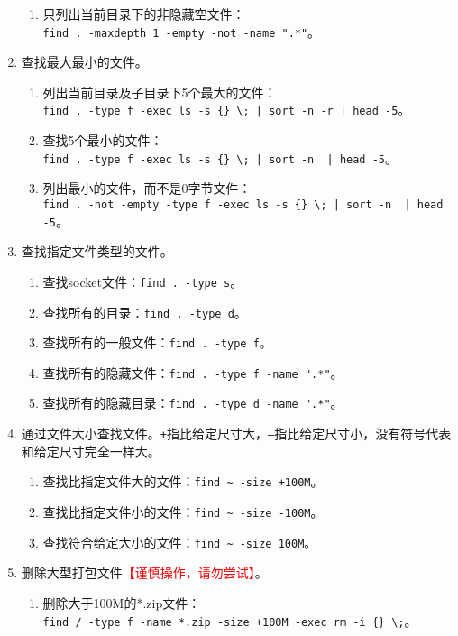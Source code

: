 \begin{enumerate}
\begin{enumerate}
      \item 只列出当前目录下的非隐藏空文件：\\ \verb|find . -maxdepth 1 -empty -not -name ".*"|。
    \end{enumerate}
  \item 查找最大最小的文件。
    \begin{enumerate}
      \item 列出当前目录及子目录下5个最大的文件：\\ \verb=find . -type f -exec ls -s {} \; | sort -n -r | head -5=。
      \item 查找5个最小的文件：\\ \verb=find . -type f -exec ls -s {} \; | sort -n  | head -5=。
      \item 列出最小的文件，而不是0字节文件：\\ \verb=find . -not -empty -type f -exec ls -s {} \; | sort -n  | head -5=。
    \end{enumerate}
  \item 查找指定文件类型的文件。
    \begin{enumerate}
      \item 查找socket文件：\verb|find . -type s|。
      \item 查找所有的目录：\verb|find . -type d|。
      \item 查找所有的一般文件：\verb|find . -type f|。
      \item 查找所有的隐藏文件：\verb|find . -type f -name ".*"|。
      \item 查找所有的隐藏目录：\verb|find . -type d -name ".*"|。
    \end{enumerate}
  \item 通过文件大小查找文件。\verb|+|指比给定尺寸大，\verb|–|指比给定尺寸小，没有符号代表和给定尺寸完全一样大。 
    \begin{enumerate}
      \item 查找比指定文件大的文件：\verb|find ~ -size +100M|。
      \item 查找比指定文件小的文件：\verb|find ~ -size -100M|。
      \item 查找符合给定大小的文件：\verb|find ~ -size 100M|。
    \end{enumerate}
  \item 删除大型打包文件\textcolor{red}{【谨慎操作，请勿尝试】}。
    \begin{enumerate}
      \item 删除大于100M的*.zip文件：\\ \verb|find / -type f -name *.zip -size +100M -exec rm -i {} \;|。

\end{enumerate}
\end{enumerate}
